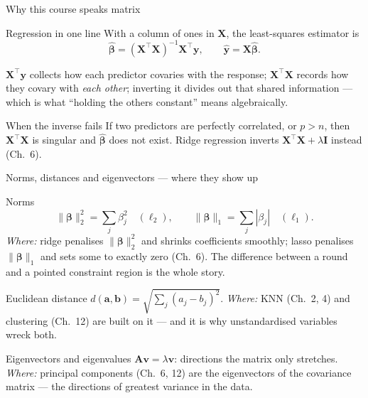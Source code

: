 \documentclass[aspectratio=169,11pt]{beamer}
\begin{document}
\begin{frame}{Why this course speaks matrix}
  \begin{block}{Regression in one line}
    With a column of ones in $\mathbf{X}$, the least-squares estimator is
    \[
      \hat{\boldsymbol\beta}
      = (\mathbf{X}^\top\mathbf{X})^{-1}\mathbf{X}^\top\mathbf{y},
      \qquad
      \hat{\mathbf{y}} = \mathbf{X}\hat{\boldsymbol\beta}.
    \]
  \end{block}
  \begin{readme}
    $\mathbf{X}^\top\mathbf{y}$ collects how each predictor covaries with the
    response; $\mathbf{X}^\top\mathbf{X}$ records how they covary with
    \emph{each other}; inverting it divides out that shared information ---
    which is what ``holding the others constant'' means algebraically.
  \end{readme}
  \begin{alertblock}{When the inverse fails}
    If two predictors are perfectly correlated, or $p > n$, then
    $\mathbf{X}^\top\mathbf{X}$ is singular and $\hat{\boldsymbol\beta}$ does
    not exist. Ridge regression inverts
    $\mathbf{X}^\top\mathbf{X} + \lambda\mathbf{I}$ instead (Ch.\ 6).
  \end{alertblock}
\end{frame}

\begin{frame}{Norms, distances and eigenvectors --- where they show up}
  \footnotesize
  \begin{block}{Norms}
    \[
      \|\boldsymbol\beta\|_2^2 = \sum_j \beta_j^2 \quad(\ell_2),
      \qquad
      \|\boldsymbol\beta\|_1 = \sum_j |\beta_j| \quad(\ell_1).
    \]
    \emph{Where:} ridge penalises $\|\boldsymbol\beta\|_2^2$ and shrinks
    coefficients smoothly; lasso penalises $\|\boldsymbol\beta\|_1$ and sets
    some to exactly zero (Ch.\ 6). The difference between a round and a
    pointed constraint region is the whole story.
  \end{block}
  \begin{block}{Euclidean distance}
    $d(\mathbf{a},\mathbf{b}) = \sqrt{\sum_j (a_j-b_j)^2}$.
    \emph{Where:} KNN (Ch.\ 2, 4) and clustering (Ch.\ 12) are built on it ---
    and it is why unstandardised variables wreck both.
  \end{block}
  \begin{block}{Eigenvectors and eigenvalues}
    $\mathbf{A}\mathbf{v} = \lambda\mathbf{v}$: directions the matrix only
    stretches. \emph{Where:} principal components (Ch.\ 6, 12) are the
    eigenvectors of the covariance matrix --- the directions of greatest
    variance in the data.
  \end{block}
\end{frame}
\end{document}
